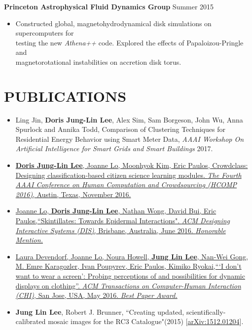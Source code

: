 \documentclass{res}
\begin{document}
\begin{resume}
\begin{tabbing}
    {\bf Princeton Astrophysical Fluid Dynamics Group}  \>\> \hspace{34pt} Summer 2015 
    \\ 
   \end{tabbing}    
    \begin{itemize}
     \vspace{-20pt}
     \item Constructed global, magnetohydrodynamical disk simulations on supercomputers for \\testing the new \textit{Athena++} code. Explored the effects of Papaloizou-Pringle and \\magnetorotational instabilities on accretion disk torus. 
     \end{itemize}    \vspace{-10pt}   
\section{PUBLICATIONS}
\begin{itemize}
\item Ling Jin, \textbf{Doris Jung-Lin Lee}, Alex Sim, Sam Borgeson, John Wu, Anna Spurlock and Annika Todd, Comparison of Clustering Techniques for Residential Energy Behavior using Smart Meter Data, \textit{AAAI Workshop On Artificial Intelligence for Smart Grids and Smart Buildings} 2017.
\item \href{http://dorisjunglinlee.com/files/crowdclass.pdf}{\textbf{Doris Jung-Lin Lee}, Joanne Lo, Moonhyok Kim, Eric Paulos, Crowdclass: Designing classification-based citizen science learning modules. \textit{The Fourth AAAI Conference on Human Computation and Crowdsourcing (HCOMP 2016)}, Austin, Texas, November 2016.}
\item \href{http://dl.acm.org/citation.cfm?id=2901885&CFID=765226474&CFTOKEN=46922780}{Joanne Lo, \textbf{Doris Jung-Lin Lee}, Nathan Wong, David Bui, Eric Paulos,``Skintillates: Towards Epidermal Interactions".  \textit{ACM Designing Interactive Systems (DIS)}, Brisbane, Australia, June 2016. \textit{Honorable Mention.}}
\item \href{http://dl.acm.org/citation.cfm?id=2858192&CFID=765226474&CFTOKEN=46922780}{Laura Devendorf, Joanne Lo, Noura Howell, \textbf{Jung Lin Lee}, Nan-Wei Gong, M. Emre Karagozler, Ivan  Poupyrev, Eric Paulos, Kimiko Ryokai,``\hspace{1pt}`I don’t want to wear a screen': Probing perceptions of and  possibilities for dynamic displays on clothing''. \textit{ACM Transactions on Computer-Human Interaction (CHI)}, San Jose, USA, May 2016. \textit{Best Paper Award.}}
\item \textbf{Jung Lin Lee}, Robert J. Brunner, ``Creating updated, scientifically-calibrated mosaic images for the RC3 Catalogue"(2015) [\href{http://arxiv.org/abs/1512.01204}{arXiv:1512.01204}]. 
\end{itemize}

\end{resume}
\end{document}
